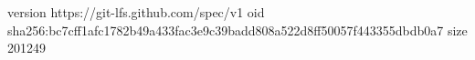 version https://git-lfs.github.com/spec/v1
oid sha256:bc7cff1afc1782b49a433fac3e9c39badd808a522d8ff50057f443355dbdb0a7
size 201249
